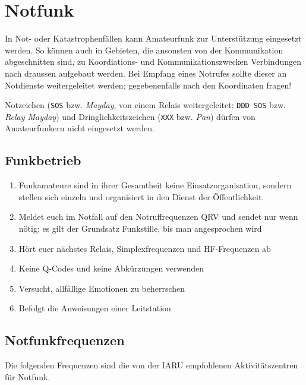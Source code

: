 

\section{Notfunk}

In Not- oder Katastrophenfällen kann Amateurfunk zur Unterstützung eingesetzt werden. So können auch in Gebieten, die ansonsten von der Kommunikation abgeschnitten sind, zu Koordiations- und Kommunikationszwecken Verbindungen nach draussen aufgebaut werden. Bei Empfang eines Notrufes sollte dieser an Notdienste weitergeleitet werden; gegebenenfalls nach den Koordinaten fragen!

Notzeichen (\texttt{SOS} bzw. \textit{Mayday}, von einem Relais weitergeleitet: \texttt{DDD SOS} bzw. \textit{Relay Mayday}) und Dringlichkeitszeichen (\texttt{XXX} bzw. \textit{Pan}) dürfen von Amateurfunkern nicht eingesetzt werden.


\subsection{Funkbetrieb}
\begin{enumerate}
 \item Funkamateure sind in ihrer Gesamtheit keine Einsatzorganisation, sondern stellen sich einzeln und organisiert in den Dienst der Öffentlichkeit.
 \item Meldet euch im Notfall auf den Notruffrequenzen QRV und sendet nur wenn nötig; es gilt der Grund­satz Funkstille, bis man angesprochen wird
 \item Hört euer nächstes Relais, Simplexfrequenzen und HF-Frequenzen ab
 \item Keine Q-Codes und keine Abkürzungen verwenden
 \item Versucht, allfällige Emotionen zu beherrschen
 \item Befolgt die Anweisungen einer Leitstation
\end{enumerate}

\subsection{Notfunkfrequenzen}
Die folgenden Frequenzen sind die von der IARU empfohlenen Aktivitätszentren für Notfunk. 


